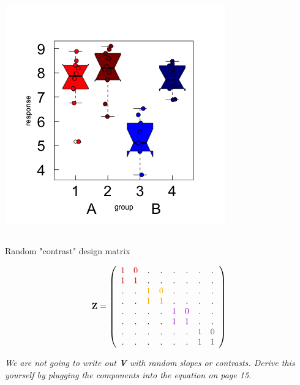 \documentclass{beamer}
\begin{document}
\begin{frame}
\begin{columns}
\begin{column}{0.5\textwidth}
            \includegraphics[width=\textwidth]{lectures/day_5_theory_of_mems/figures/unnamed-chunk-16-1.png}
        \end{column}
    \end{columns}
\end{frame}

\begin{frame}
\centering
\large
Random "contrast" design matrix
\vspace{0.2cm}

\[
\mathbf{Z} = \left( 
\begin{array}{cccccccc} 
\color{darkred}{1} & \color{darkred}{0} & . & . & . & . & . & .\\ 
\color{darkred}{1} & \color{darkred}{1} & . & . & . & . & . & .\\ 
. & . & \color{orange}{1} & \color{orange}{0} & . & . & . & .\\ 
. & . & \color{orange}{1} & \color{orange}{1} & . & . & . & .\\ 
. & . & . & . & \color{violet}{1} & \color{violet}{0} & . & .\\ 
. & . & . & . & \color{violet}{1} & \color{violet}{1} & . & .\\ 
. & . & . & . & . & . & \color{darkgray}{1} & \color{darkgray}{0}\\ 
. & . & . & . & . & . & \color{darkgray}{1} & \color{darkgray}{1}
\end{array}\right)
\]
\vspace{0.2cm}

\textit{We are not going to write out \textbf{V} with random slopes or contrasts. Derive this yourself by plugging the components into the equation on page 15.}
\end{frame}
\end{document}
